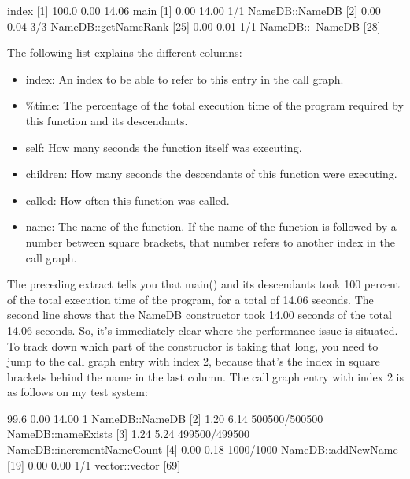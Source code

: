 \begin{shell}
index   %
[1]     100.0   0.00     14.06                main [1]
                0.00     14.00       1/1          NameDB::NameDB [2]
                0.00      0.04       3/3          NameDB::getNameRank [25]
                0.00      0.01       1/1          NameDB::~NameDB [28]
\end{shell}

The following list explains the different columns:

\begin{itemize}
\item
index: An index to be able to refer to this entry in the call graph.

\item
\%time: The percentage of the total execution time of the program required by this function and its descendants.

\item
self: How many seconds the function itself was executing.

\item
children: How many seconds the descendants of this function were executing.

\item
called: How often this function was called.

\item
name: The name of the function. If the name of the function is followed by a number between square brackets, that number refers to another index in the call graph.
\end{itemize}

The preceding extract tells you that main() and its descendants took 100 percent of the total execution time of the program, for a total of 14.06 seconds. The second line shows that the NameDB constructor took 14.00 seconds of the total 14.06 seconds. So, it’s immediately clear where the performance issue is situated. To track down which part of the constructor is taking that long, you need to jump to the call graph entry with index 2, because that’s the index in square brackets behind the name in the last column. The call graph entry with index 2 is as follows on my test system:

\begin{shell}
[2] 99.6   0.00   14.00         1            NameDB::NameDB [2]
           1.20    6.14    500500/500500         NameDB::nameExists [3]
           1.24    5.24    499500/499500         NameDB::incrementNameCount [4]
           0.00    0.18      1000/1000           NameDB::addNewName [19]
           0.00    0.00         1/1              vector::vector [69]
\end{shell}

